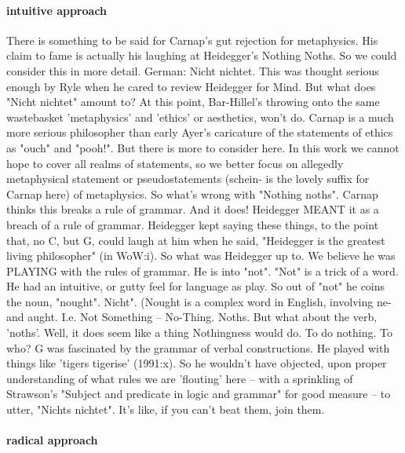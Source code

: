 \documentclass[10pt,titlepage]{book}
\begin{document}
{\paragraph{intuitive approach}

There is something to be said for Carnap's gut  
rejection for metaphysics.
His claim to fame is actually his laughing at Heidegger's Nothing Noths. So we could consider this in more detail. German:  Nicht 
nichtet. This was thought serious enough by Ryle when he cared to review  
Heidegger for Mind. But what does "Nicht nichtet" amount to? At this point,  
Bar-Hillel's throwing onto the same wastebasket 'metaphysics' and 'ethics' or  
aesthetics, won't do. Carnap is a much more serious philosopher than early  
Ayer's caricature of the statements of ethics as "ouch" and "pooh!". But 
there  is more to consider here. In this work we cannot hope to cover all 
realms of  statements, so we better focus on allegedly metaphysical statement or 
 pseudostatements (schein- is the lovely suffix for Carnap here) of 
metaphysics.  So what's wrong with "Nothing noths". Carnap thinks this breaks a 
rule of  grammar. And it does! Heidegger MEANT it as a breach of a rule of 
grammar.  Heidegger kept saying these things, to the point that, no C, but G, 
could laugh  at him when he said, "Heidegger is the greatest living 
philosopher" (in WoW:i).  So what was Heidegger up to. We believe he was PLAYING with 
the rules of  grammar. He is into "not". "Not" is a trick of a word. He had 
an intuitive, or  gutty feel for language as play. So out of "not" he coins 
the noun, "nought".  Nicht". (Nought is a complex word in English, involving 
ne- and aught. I.e. Not  Something -- No-Thing. Noths. But what about the 
verb, 'noths'. Well, it does  seem like a thing Nothingness would do. To do 
nothing. To who? G was fascinated  by the grammar of verbal constructions. He 
played with things like 'tigers  tigerise' (1991:x). So he wouldn't have 
objected, upon proper understanding of  what rules we are 'flouting' here -- 
with a sprinkling of Strawson's "Subject  and predicate in logic and grammar" 
for good measure -- to utter, "Nichts  nichtet". It's like, if you can't 
beat them, join them.
 
\paragraph{radical approach}

}
\end{document}
